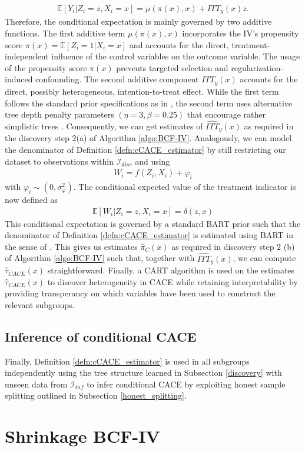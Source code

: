 \begin{align*}
    \mathbb{E}\left[Y_i | Z_i = z, X_i=x \right] = \mu\left(\pi(x), x\right) + ITT_y(x)z. 
\end{align*}
Therefore, the conditional expectation is mainly governed by two additive functions. 
The first additive term $\mu\left(\pi(x), x\right)$ incorporates the IV's propensity score $\pi(x)=\mathbb{E}[Z_i=1 | X_i=x]$ and accounts for the direct, treatment-independent influence of the control variables on the outcome variable. 
The usage of the propensity score $\pi(x)$ prevents targeted selection and regularization-induced confounding. 
The second additive component $ITT_y(x)$ accounts for the direct, possibly heterogeneous, intention-to-treat effect. 
While the first term follows the standard prior specifications as in \cite{chipman_bart_2010}, the second term uses alternative tree depth penalty parameters $(\eta = 3, \beta=0.25)$ that encourage rather simplistic trees \cite{hahn_bayesian_2020}.
Consequently, we can get estimates of $\widehat{ITT}_y(x)$ as required in the discovery step 2(a) of Algorithm \ref{algo:BCF-IV}.
Analogously, we can model the denominator of Definition \ref{defn:cCACE_estimator} by still restricting our dataset to observations within $\mathcal{I}_{disc}$ and using
\begin{align*}
    W_i = f(Z_i, X_i) + \varphi_i 
\end{align*}
with $\varphi_i \sim \left(0, \sigma_{\varphi}^2\right)$. The conditional expected value of the treatment indicator is now defined as       
\begin{align*}
    \mathbb{E}\left[W_i | Z_i = z, X_i=x \right] = \delta(z, x)
\end{align*}
This conditional expectation is governed by a standard BART prior such that the denominator of Definition \ref{defn:cCACE_estimator} is estimated using BART in the sense of \cite{Hill_2011}. This gives us estimates $\widehat{\pi}_{C}(x)$ as required in discovery step 2 (b) of Algorithm \ref{algo:BCF-IV} such that, together with $\widehat{ITT}_y(x)$, we can compute $\widehat\tau_{CACE}(x)$ straightforward.
Finally, a CART algorithm is used on the estimates $\widehat\tau_{CACE}(x)$ to discover heterogeneity in CACE while retaining interpretability by providing transperancy on which variables have been used to construct the relevant subgroups. 

\subsection{Inference of conditional CACE}
\label{inference}
Finally, Definition \ref{defn:cCACE_estimator} is used in all subgroups independently using the tree structure learned in Subsection \ref{discovery} with unseen data from $\mathcal{I}_{inf}$ to infer conditional CACE by exploiting honest sample splitting outlined in Subsection \ref{honest_splitting}.  




\section{Shrinkage BCF-IV}
\label{sec:SBCF-IV}



